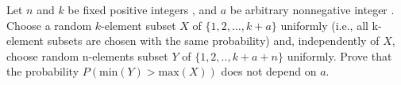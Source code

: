 Let \(n\) and \(k\) be fixed positive integers , and \(a\) be arbitrary nonnegative integer .
Choose a random \(k\)-element subset \(X\) of \(\{1,2,\dots,k+a\}\) uniformly (i.e., all k-element subsets are chosen with the same probability) and, independently of \(X\), choose  random n-elements subset \(Y\) of \(\{1,2,..,k+a+n\}\) uniformly.
Prove that the probability
\(P\left( \text{min}(Y)>\text{max}(X)\right)\)
does not depend on \(a\).